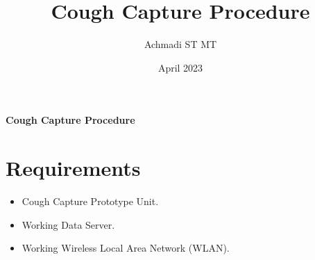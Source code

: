 \documentclass[a4paper,12pt,oneside,pdflatex,italian,final,twocolumn]{article}
\title{Cough Capture Procedure}
\author{Achmadi ST MT}
\date{April 2023}
\begin{document}
	\pagestyle{fancy}

	\chead{\today}

	\onecolumn

	\begin{figure}

	\end{figure}\begin{minipage}{0.47\textwidth}
		\centering

	\end{minipage}
	\hfill
	\begin{minipage}{0.47\textwidth}
		\raggedleft
		\Huge \textbf{Cough Capture Procedure}
	\end{minipage}

	\section{Requirements}

	\begin{itemize}
		\item Cough Capture Prototype Unit.

		\item Working Data Server.

		\item Working Wireless Local Area Network (WLAN).
	\end{itemize}
\end{document}
